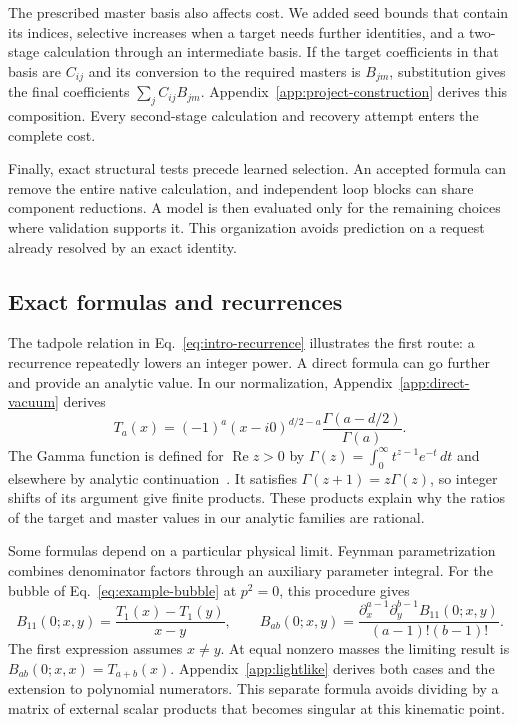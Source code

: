 The prescribed master basis also affects cost. We added seed bounds that contain its indices, selective increases when a target needs further identities, and a two-stage calculation through an intermediate basis. If the target coefficients in that basis are $C_{ij}$ and its conversion to the required masters is $B_{jm}$, substitution gives the final coefficients $\sum_j C_{ij}B_{jm}$. Appendix~\ref{app:project-construction} derives this composition. Every second-stage calculation and recovery attempt enters the complete cost.

Finally, exact structural tests precede learned selection. An accepted formula can remove the entire native calculation, and independent loop blocks can share component reductions. A model is then evaluated only for the remaining choices where validation supports it. This organization avoids prediction on a request already resolved by an exact identity.

\subsection{Exact formulas and recurrences}
\label{sec:exact}
The tadpole relation in Eq.~\eqref{eq:intro-recurrence} illustrates the first route: a recurrence repeatedly lowers an integer power. A direct formula can go further and provide an analytic value. In our normalization, Appendix~\ref{app:direct-vacuum} derives
\begin{equation}
 T_a(x)=(-1)^a(x-i0)^{d/2-a}
 \frac{\Gamma(a-d/2)}{\Gamma(a)}.
 \label{eq:main-tadpole-value}
\end{equation}
The Gamma function is defined for $\operatorname{Re}z>0$ by
$\Gamma(z)=\int_0^\infty t^{z-1}e^{-t}\,dt$ and elsewhere by analytic continuation~\cite{NISTGamma}.
It satisfies $\Gamma(z+1)=z\Gamma(z)$, so integer shifts of its argument give finite products. These products explain why the ratios of the target and master values in our analytic families are rational.

Some formulas depend on a particular physical limit. Feynman parametrization combines denominator factors through an auxiliary parameter integral. For the bubble of Eq.~\eqref{eq:example-bubble} at $p^2=0$, this procedure gives
\begin{equation}
 B_{11}(0;x,y)=\frac{T_1(x)-T_1(y)}{x-y},\qquad
 B_{ab}(0;x,y)=
 \frac{\partial_x^{a-1}\partial_y^{b-1}B_{11}(0;x,y)}
 {(a-1)!(b-1)!}.
 \label{eq:light-main}
\end{equation}
The first expression assumes $x\ne y$. At equal nonzero masses the limiting result is $B_{ab}(0;x,x)=T_{a+b}(x)$. Appendix~\ref{app:lightlike} derives both cases and the extension to polynomial numerators. This separate formula avoids dividing by a matrix of external scalar products that becomes singular at this kinematic point.

